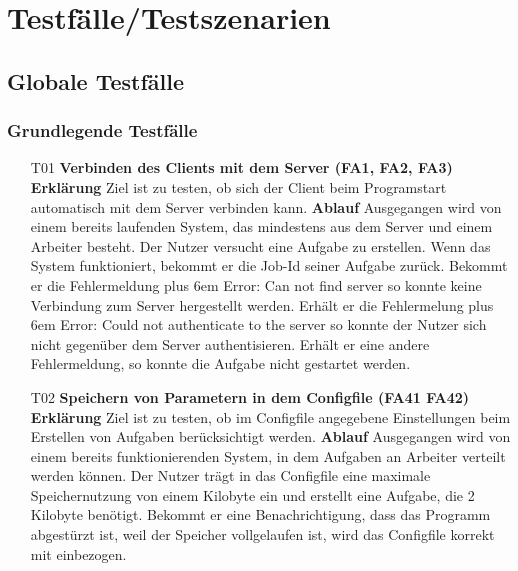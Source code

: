 \documentclass[a4paper,12pt]{article}
\makeatletter
\newenvironment{mycode}
 {\def\@xobeysp{\ }\verbatim\rightskip=0pt plus 6em\relax}
 {\endverbatim}
\makeatother
\begin{document}
\clearpage
\section{Testfälle/Testszenarien}
\subsection{Globale Testfälle}
\subsubsection{Grundlegende Testfälle}

\begin{itemize}
\item[T01] \textbf{Verbinden des Clients mit dem Server (FA1, FA2, FA3)}
\subitem \textbf{Erklärung} Ziel ist zu testen, ob sich der Client beim Programstart automatisch mit dem Server verbinden kann.
\subitem \textbf{Ablauf} Ausgegangen wird von einem bereits laufenden System, das mindestens aus dem Server und einem Arbeiter besteht.
Der Nutzer versucht eine Aufgabe zu erstellen.
Wenn das System funktioniert, bekommt er die Job-Id seiner Aufgabe zurück.
Bekommt er die Fehlermeldung
\begin{mycode}
Error: Can not find server
\end{mycode}
so konnte keine Verbindung zum Server hergestellt werden. Erhält er die Fehlermelung
\begin{mycode}
Error: Could not authenticate to the server
\end{mycode}
so konnte der Nutzer sich nicht gegenüber dem Server authentisieren. Erhält er eine andere Fehlermeldung, so konnte die Aufgabe nicht gestartet werden.

\item[T02] \textbf{Speichern von Parametern in dem \gls{Configfile} (FA41 FA42)}
\subitem \textbf{Erklärung} Ziel ist zu testen, ob im \gls{Configfile} angegebene Einstellungen beim Erstellen von Aufgaben berücksichtigt werden.
\subitem \textbf{Ablauf} Ausgegangen wird von einem bereits funktionierenden System, in dem Aufgaben an Arbeiter verteilt werden können.
Der Nutzer trägt in das \gls{Configfile} eine maximale Speichernutzung von einem Kilobyte ein und erstellt eine Aufgabe, die 2 Kilobyte benötigt.
Bekommt er eine Benachrichtigung, dass das Programm abgestürzt ist, weil der Speicher vollgelaufen ist, wird das \gls{Configfile} korrekt mit einbezogen.


\end{itemize}
\end{document}
